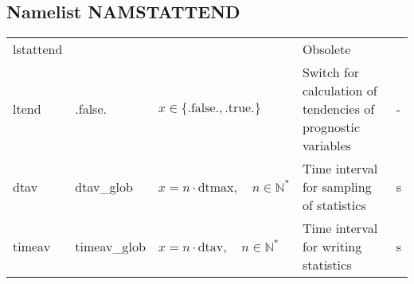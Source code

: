\documentclass[twoside,11pt,fleqn,a4paper,english,openright]{report}
\begin{document}
\newpage
\subsection{Namelist NAMSTATTEND}\label{par:stattend}
\begin{center}
  \tablelasttail{
        &&&&\\\hline
  }
\begin{supertabular}{|l|p{2cm}|p{4cm}|p{6cm}|l|}
  lstattend	& & & Obsolete & \\
  ltend	& .false.	& $x\in\{\text{.false.},\text{.true.}\}$	& Switch for calculation of tendencies of prognostic variables & -\\
  dtav		& dtav\_glob	& $x = n \cdot \text{dtmax}, \quad n \in \mathbb{N}^*$	& Time interval for sampling of statistics	& s\\
  timeav	& timeav\_glob	& $x = n \cdot \text{dtav}, \quad n \in \mathbb{N}^*$	& Time interval for writing statistics	& s\\
\end{supertabular}
\end{center}
\end{document}
